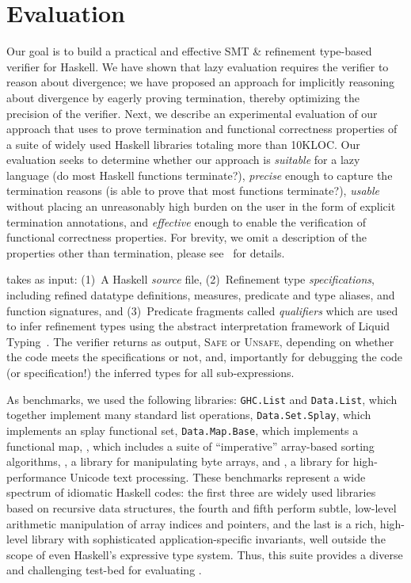\section{Evaluation}\label{sec:evaluation}

Our goal is to build a practical and effective 
SMT \& refinement type-based verifier for Haskell. 
%
We have shown that lazy evaluation requires the 
verifier to reason about divergence; we have proposed 
an approach for implicitly reasoning about divergence 
by eagerly proving termination, thereby optimizing 
the precision of the verifier.
%
Next, we describe an experimental evaluation of our 
approach that uses \toolname to prove termination and 
functional correctness properties of a suite of widely 
used Haskell libraries totaling more than 10KLOC.
%
Our evaluation seeks to determine whether our approach is
%
\emph{suitable} for a lazy language (\ie do most Haskell functions terminate?),
\emph{precise}  enough to  capture the termination reasons (\ie is \toolname able to prove that most functions terminate?), 
\emph{usable}   without placing an unreasonably high burden on the user in the form of explicit termination annotations, and
\emph{effective}  enough to  enable the verification of functional correctness properties.
%
For brevity, we omit a description of the properties other
than termination, please see~\cite{realworldliquid14} for details.

 \toolname takes as input:
%
(1)~A Haskell \emph{source} file, 
%
(2)~Refinement type \emph{specifications}, 
    including refined datatype definitions,
    measures, predicate and type aliases,
    and function signatures, and
%
(3)~Predicate fragments called \emph{qualifiers}
    which are used to infer refinement types using 
    the abstract interpretation framework of Liquid
    Typing~\cite{LiquidPLDI08}.
%
The verifier returns as output, \textsc{Safe} or \textsc{Unsafe}, 
depending on whether the code meets the specifications or not, 
and, importantly for debugging the code (or specification!) 
the inferred types for all sub-expressions.

As benchmarks, we used the following libraries:
%
\texttt{GHC.List} and \texttt{Data.List}, which together implement many standard
list operations,
\texttt{Data.Set.Splay}, which implements an splay functional set,
\texttt{Data.Map.Base}, which implements a functional 
map,
\libvectoralgos, 
which includes a suite of ``imperative'' %
array-based sorting algorithms,
\bytestring, a library for manipulating byte arrays, and
\libtext, a library for high-performance Unicode text processing. 
%
These benchmarks represent a wide spectrum of idiomatic
Haskell codes: the first three are widely used libraries 
based on recursive data structures, the fourth and fifth 
perform subtle, low-level arithmetic manipulation of array
indices and pointers, and the last is a rich, high-level
library with sophisticated application-specific invariants,
well outside the scope of even Haskell's expressive type system.
Thus, this suite provides a diverse and challenging test-bed 
for evaluating \toolname.


